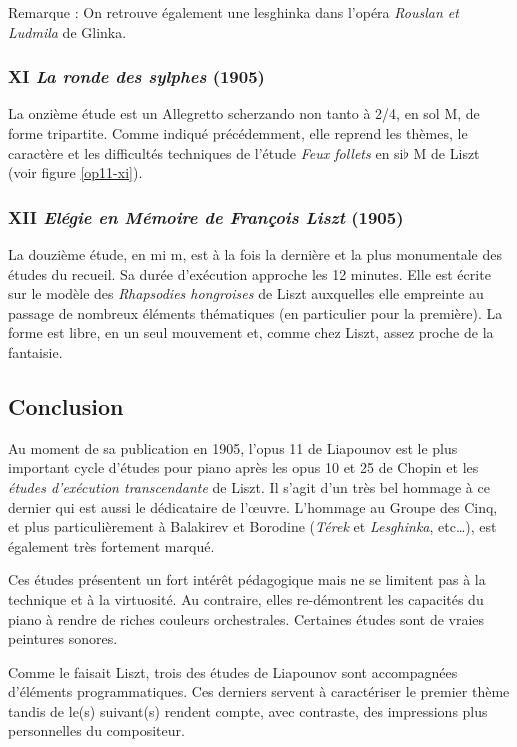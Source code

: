 Remarque : On retrouve également une lesghinka dans l'opéra \emph{Rouslan et Ludmila} de Glinka.

\newpage

\subsubsection{XI \emph{La ronde des sylphes} (1905)}

La onzième étude est un Allegretto scherzando non tanto à 2/4, en sol M, de forme tripartite. Comme indiqué précédemment, elle reprend les thèmes, le caractère et les difficultés techniques de l'étude \emph{Feux follets} en si$\flat$ M de Liszt (voir figure \ref{op11-xi}).

\subsubsection{XII \emph{Elégie en Mémoire de François Liszt} (1905)}

La douzième étude, en mi m, est à la fois la dernière et la plus monumentale des études du recueil. Sa durée d'exécution approche les 12 minutes. Elle est écrite sur le modèle des \emph{Rhapsodies hongroises} de Liszt auxquelles elle empreinte au passage de nombreux éléments thématiques (en particulier pour la première). La forme est libre, en un seul mouvement et, comme chez Liszt, assez proche de la fantaisie.

\subsection{Conclusion}

Au moment de sa publication en 1905, l'opus 11 de Liapounov est le plus important cycle d'études pour piano après les opus 10 et 25 de Chopin et les \emph{études d'exécution transcendante} de Liszt. Il s'agit d'un très bel hommage à ce dernier qui est aussi le dédicataire de l'œuvre. L'hommage au Groupe des Cinq, et plus particulièrement à Balakirev et Borodine (\emph{Térek} et \emph{Lesghinka}, etc\dots), est également très fortement marqué.

Ces études présentent un fort intérêt pédagogique mais ne se limitent pas à la technique et à la virtuosité. Au contraire, elles re-démontrent les capacités du piano à rendre de riches couleurs orchestrales. Certaines études sont de vraies peintures sonores.

Comme le faisait Liszt, trois des études de Liapounov sont accompagnées d'éléments programmatiques. Ces derniers servent à caractériser le premier thème tandis de le(s) suivant(s) rendent compte, avec contraste, des impressions plus personnelles du compositeur.

